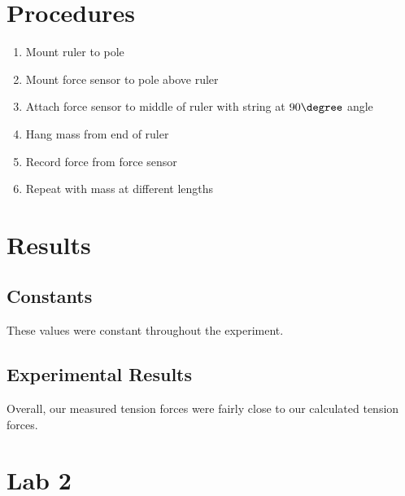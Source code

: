 \documentclass{article}
\begin{document}
\section*{Procedures}
\begin{enumerate}
    \item Mount ruler to pole
    \item Mount force sensor to pole above ruler
    \item Attach force sensor to middle of ruler with string at $90\degree$ angle
    \item Hang mass from end of ruler
    \item Record force from force sensor
    \item Repeat with mass at different lengths
\end{enumerate}
\section*{Results}
\subsection*{Constants}
These values were constant throughout the experiment.
\begin{center}
\end{center}
\subsection*{Experimental Results}
\begin{center}
\end{center}

Overall, our measured tension forces were fairly close to our calculated tension forces.

\section{Lab 2}
\end{document}
